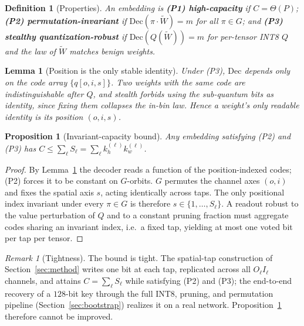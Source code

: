 \documentclass[a4paper,fleqn]{cas-dc}
\theoremstyle{plain}
\newtheorem{definition}{Definition}
\newtheorem{lemma}{Lemma}
\newtheorem{proposition}{Proposition}
\theoremstyle{remark}
\newtheorem{remark}{Remark}
\begin{document}
\begin{definition}[Properties]\label{def:props}
An embedding is \textbf{(P1) high-capacity} if $C=\Theta(P)$; \textbf{(P2)
permutation-invariant} if $\mathrm{Dec}(\pi\!\cdot\!\tilde W)=m$ for all $\pi\in G$; and
\textbf{(P3) stealthy quantization-robust} if $\mathrm{Dec}(Q(\tilde W))=m$ for
per-tensor INT8 $Q$ and the law of $\tilde W$ matches benign weights.
\end{definition}

\begin{lemma}[Position is the only stable identity]\label{lem:pos}
Under \textup{(P3)}, $\mathrm{Dec}$ depends only on the code array $\{q[o,i,s]\}$.
Two weights with the same code are indistinguishable after $Q$, and stealth forbids
using the sub-quantum bits as identity, since fixing them collapses the in-bin law.
Hence a weight's only readable identity is its position $(o,i,s)$.
\end{lemma}

\begin{proposition}[Invariant-capacity bound]\label{prop:bound}
Any embedding satisfying \textup{(P2)} and \textup{(P3)} has
$C\le\sum_{\ell} S_\ell=\sum_\ell k_h^{(\ell)}k_w^{(\ell)}$.
\end{proposition}
\begin{proof}
By Lemma~\ref{lem:pos} the decoder reads a function of the position-indexed codes;
(P2) forces it to be constant on $G$-orbits. $G$ permutes the channel axes $(o,i)$ and
fixes the spatial axis $s$, acting identically across taps. The only positional index
invariant under every $\pi\in G$ is therefore $s\in\{1,\dots,S_\ell\}$. A readout
robust to the value perturbation of $Q$ and to a constant pruning fraction must
aggregate codes sharing an invariant index, i.e.\ a fixed tap, yielding at most one
voted bit per tap per tensor.
\end{proof}

\begin{remark}[Tightness]\label{rem:tight}
The bound is tight. The spatial-tap construction of Section~\ref{sec:method} writes one
bit at each tap, replicated across all $O_\ell I_\ell$ channels, and attains
$C=\sum_\ell S_\ell$ while satisfying (P2) and (P3); the end-to-end recovery of a
$128$-bit key through the full INT8, pruning, and permutation pipeline
(Section~\ref{sec:bootstrap}) realizes it on a real network. Proposition~\ref{prop:bound}
therefore cannot be improved.
\end{remark}
\end{document}
